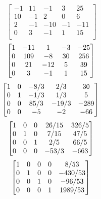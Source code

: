 \begin{equation*}
    \begin{bmatrix}
        -1 & 11 & -1 & 3 & 25\\
        10 & -1 & 2 & 0 & 6\\
        2 & -1 & -10 & -1 & -11\\
        0 & 3 & -1 & 1 & 15\\
    \end{bmatrix}
\end{equation*}
\begin{equation*}    
    \begin{bmatrix}
        1 & -11 & 1 & -3 & -25\\
        0 & 109 & -8 & 30 & 256\\
        0 & 21 & -12 & 5 & 39\\
        0 & 3 & -1 & 1 & 15\\
    \end{bmatrix} \\
\end{equation*}
\begin{equation*}
    \begin{bmatrix}
        1 & 0 & -8/3 & 2/3 & 30 \\
        0 & 1 & -1/3 & 1/3 & 5 \\
        0 & 0 & 85/3 & -19/3 & -289 \\
        0 & 0 & -5 & -2 & -66 \\
    \end{bmatrix} \\
\end{equation*}
\begin{equation*}
    \begin{bmatrix}
        1 & 0 & 0 & 26/15 & 326/5 \\
        0 & 1 & 0 & 7/15 & 47/5 \\
        0 & 0 & 1 & 2/5 & 66/5 \\
        0 & 0 & 0 & -53/3 & -663 \\
    \end{bmatrix} \\
\end{equation*}
\begin{equation*}
    \begin{bmatrix}
        1 & 0 & 0 & 0 & 8/53 \\
        0 & 1 & 0 & 0 & -430/53 \\
        0 & 0 & 1 & 0 & -96/53 \\
        0 & 0 & 0 & 1 & 1989/53 \\
    \end{bmatrix} \\
\end{equation*}

